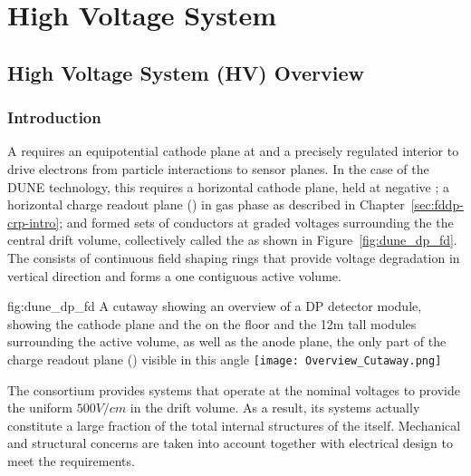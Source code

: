 \chapter{High Voltage System}
\label{ch:fddp-hv}

\section{High Voltage System (HV) Overview}
\label{sec:fddp-hv-ov}


\subsection{Introduction}
\label{sec:fddp-hv-intro}

A  requires an equipotential cathode plane at  and a precisely regulated interior \efield to drive 
electrons from particle interactions to sensor planes.  In the case of the DUNE  technology, 
this requires a horizontal cathode plane, held at negative ; a horizontal charge readout plane () in gas phase as described in  Chapter~\ref{sec:fddp-crp-intro}; and formed sets of conductors at graded voltages surrounding the
 the central drift volume, collectively called the  as shown in Figure~\ref{fig:dune_dp_fd}. The  consists of continuous field shaping rings that provide voltage degradation in vertical direction and forms a one contiguous active volume.


\begin{dunefigure}[A DP Overview]{fig:dune_dp_fd}
{A cutaway showing an overview of a DP detector module, showing the cathode plane and the  on the floor and the 12m tall  modules surrounding the active volume, as well as the anode plane, the only part of the charge readout plane () visible in this angle}
\texttt{[image: Overview\_Cutaway.png]}
\end{dunefigure}

The  consortium provides systems that operate at the nominal voltages to provide the uniform $500V/cm$ \efield in the  drift volume. As a result, its systems actually constitute a large fraction of the total internal structures of the  itself. Mechanical and structural concerns are taken into account together with electrical design to meet the requirements. 

